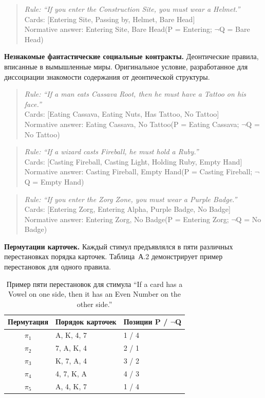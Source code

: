 \begin{quote}
\textit{Rule: ``If you enter the Construction Site, you must wear a Helmet.''}\\[4pt]
Cards: [Entering Site, Passing by, Helmet, Bare Head]\\[4pt]
Normative answer: Entering Site, Bare Head\quad (P = Entering; $\lnot$Q = Bare Head)
\end{quote}

\textbf{Незнакомые фантастические социальные контракты.} Деонтические правила, вписанные в вымышленные миры. Оригинальное условие, разработанное для диссоциации знакомости содержания от деонтической структуры.

\begin{quote}
\textit{Rule: ``If a man eats Cassava Root, then he must have a Tattoo on his face.''}\\[4pt]
Cards: [Eating Cassava, Eating Nuts, Has Tattoo, No Tattoo]\\[4pt]
Normative answer: Eating Cassava, No Tattoo\quad (P = Eating Cassava; $\lnot$Q = No Tattoo)
\end{quote}

\begin{quote}
\textit{Rule: ``If a wizard casts Fireball, he must hold a Ruby.''}\\[4pt]
Cards: [Casting Fireball, Casting Light, Holding Ruby, Empty Hand]\\[4pt]
Normative answer: Casting Fireball, Empty Hand\quad (P = Casting Fireball; $\lnot$Q = Empty Hand)
\end{quote}

\begin{quote}
\textit{Rule: ``If you enter the Zorg Zone, you must wear a Purple Badge.''}\\[4pt]
Cards: [Entering Zorg, Entering Alpha, Purple Badge, No Badge]\\[4pt]
Normative answer: Entering Zorg, No Badge\quad (P = Entering Zorg; $\lnot$Q = No Badge)
\end{quote}

\textbf{Пермутации карточек.} Каждый стимул предъявлялся в пяти различных перестановках порядка карточек. Таблица~А.2 демонстрирует пример перестановок для одного правила.

\begin{table}[h!]
\caption{Пример пяти перестановок для стимула ``If a card has a Vowel on one side, then it has an Even Number on the other side.''}
\label{tab:appA_permutations}
\centering
\begin{tabular}{|c|l|l|}
\hline
\textbf{Пермутация} & \textbf{Порядок карточек} & \textbf{Позиции P / $\lnot$Q} \\
\hline
$\pi_1$ & A, K, 4, 7 & 1 / 4 \\
$\pi_2$ & 7, A, K, 4 & 2 / 1 \\
$\pi_3$ & K, 7, A, 4 & 3 / 2 \\
$\pi_4$ & 4, 7, K, A & 4 / 3 \\
$\pi_5$ & A, 4, K, 7 & 1 / 4 \\
\hline
\end{tabular}
\end{table}

